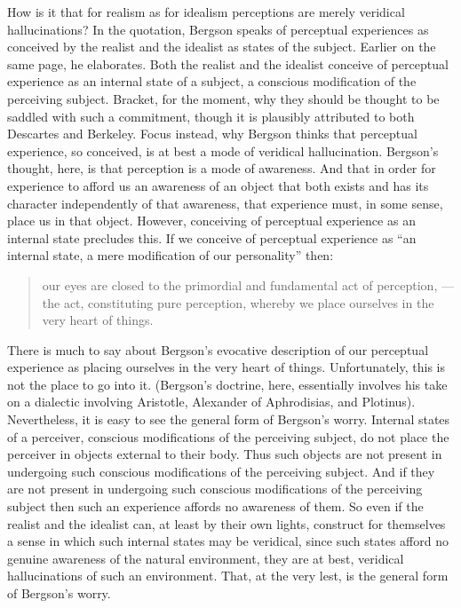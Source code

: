 \documentclass[12pt]{article}
\begin{document}
How is it that for realism as for idealism perceptions are merely veridical hallucinations? In the quotation, Bergson speaks of perceptual experiences as conceived by the realist and the idealist as states of the subject. Earlier on the same page, he elaborates. Both the realist and the idealist conceive of perceptual experience as an internal state of a subject, a conscious modification of the perceiving subject. Bracket, for the moment, why they should be thought to be saddled with such a commitment, though it is plausibly attributed to both Descartes and Berkeley. Focus instead, why Bergson thinks that perceptual experience, so conceived, is at best a mode of veridical hallucination. Bergson's thought, here, is that perception is a mode of awareness. And that in order for experience to afford us an awareness of an object that both exists and has its character independently of that awareness, that experience must, in some sense, place us in that object. However, conceiving of perceptual experience as an internal state precludes this. If we conceive of perceptual experience as ``an internal state, a mere modification of our personality'' then:
\begin{quote}
	our eyes are closed to the primordial and fundamental act of perception, ---the act, constituting pure perception, whereby we place ourselves in the very heart of things. \citep[73]{Bergson:1912pi}
\end{quote}
There is much to say about Bergson's evocative description of our perceptual experience as placing ourselves in the very heart of things. Unfortunately, this is not the place to go into it. (Bergson's doctrine, here, essentially involves his take on a dialectic involving Aristotle, Alexander of Aphrodisias, and Plotinus). Nevertheless, it is easy to see the general form of Bergson's worry. Internal states of a perceiver, conscious modifications of the perceiving subject, do not place the perceiver in objects external to their body. Thus such objects are not present in undergoing such conscious modifications of the perceiving subject. And if they are not present in undergoing such conscious modifications of the perceiving subject then such an experience affords no awareness of them. So even if the realist and the idealist can, at least by their own lights, construct for themselves a sense in which such internal states may be veridical, since such states afford no genuine awareness of the natural environment, they are at best, veridical hallucinations of such an environment. That, at the very lest, is the general form of Bergson's worry.
\end{document}
